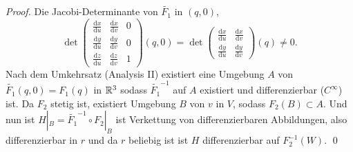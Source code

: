 \begin{remark}
\begin{proof}
    Die Jacobi-Determinante von \( \widetilde{F_1} \) in \( (q,0) \),
    \begin{equation*}
      \det \begin{pmatrix}
        \frac{\text{d}x}{\text{d}u} & \frac{\text{d}x}{\text{d}v} & 0 \\
        \frac{\text{d}y}{\text{d}u} & \frac{\text{d}y}{\text{d}v} & 0 \\
        \frac{\text{d}z}{\text{d}u} & \frac{\text{d}z}{\text{d}v} & 1
      \end{pmatrix}(q,0) = \det \begin{pmatrix}
        \frac{\text{d}x}{\text{d}u} & \frac{\text{d}x}{\text{d}v} \\
        \frac{\text{d}y}{\text{d}u} & \frac{\text{d}y}{\text{d}v}
      \end{pmatrix}(q) \neq 0\text{.}
    \end{equation*}
    Nach dem Umkehrsatz (Analysis II) existiert eine Umgebung \( A \) von \( \widetilde{F_1}(q,0) = F_1(q) \) in \( \mathbb{R}^3 \) sodass \( \widetilde{F_1}^{-1} \) auf \( A \) existiert und differenzierbar (\( C^\infty \)) ist. Da \( F_2 \) stetig ist, existiert Umgebung \( B \) von \( v \) in \( V \), sodass \( F_2(B) \subset A \). Und nun ist \( H|_B = \widetilde{F_1}^{-1} \circ F_2|_B \) ist Verkettung von differenzierbaren Abbildungen, also differenzierbar in \( r \) und da \( r \) beliebig ist ist \( H \) differenzierbar auf \( F_2^{-1}(W) \). \qed{}
  \end{proof}
\end{remark}

